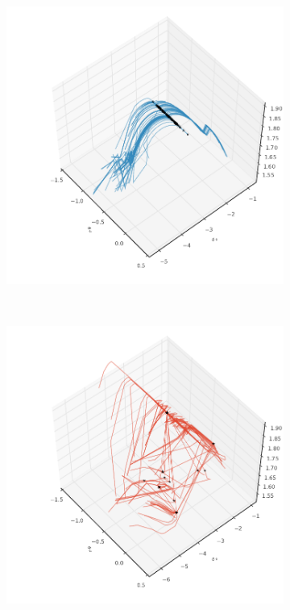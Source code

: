 \begin{figure}[htbp]%
    \centering%
    \vspace*{-1.5cm}%
    \begin{subfigure}[t]{\textwidth}%
    	\includegraphics{img/harmonic_3D0}%
    \end{subfigure}\\%
    \vspace*{-1.7cm}%
    \begin{subfigure}[t]{\textwidth}%
		\includegraphics{img/harmonic_3D1}%

\end{subfigure}
\end{figure}
